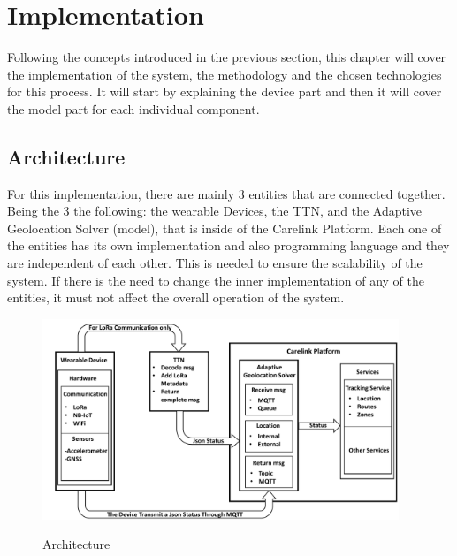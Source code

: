 


\chapter{Implementation}
\label{cha:Implementation}

Following the concepts introduced in the previous section, this chapter will cover the implementation of the system, the methodology and the chosen technologies for this process.  It will start by explaining the device part and then it will cover the model part for each individual component.


\section{Architecture}
\label{sec:Architecture}

For this implementation, there are mainly 3  entities that are connected together. Being the 3 the following: the wearable Devices, the TTN, and the Adaptive Geolocation Solver (model), that is inside of the Carelink Platform.
Each one of the entities has its own implementation and also programming language and they are independent of each other.
This is needed to ensure the scalability of the system.
If there is the need to change the inner implementation of any of the entities, it must not affect the overall operation of the system.

\begin{figure}[htbp]
  \centering
    {\includegraphics[height=6cm,width=0.9\linewidth]{Chapters/Figures/arch4.pdf}}%
 
  \caption{Architecture}
  \label{fig:Arch}
\end{figure}



